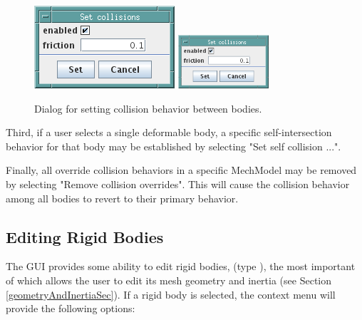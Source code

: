 \documentclass{article}
\begin{document}
\begin{figure}
\begin{center}
\iflatexml
\includegraphics[]{images/setCollisionsDialog}
\else
\includegraphics[width=0.30\textwidth]{images/setCollisionsDialog}
\fi
\end{center}
\caption{Dialog for setting collision behavior between bodies.}%
\label{setCollisionsDialogFig}
\end{figure}

Third, if a user selects a single deformable body, a specific
self-intersection behavior for that body may be established by selecting
{\sf "Set self collision ..."}.

Finally, all override collision behaviors in a specific MechModel may
be removed by selecting {\sf "Remove collision overrides"}. This will
cause the collision behavior among all bodies to revert to their
primary behavior.

\subsection{Editing Rigid Bodies}

The GUI provides some ability to edit rigid bodies,
(type ), 
the most important
of which allows the user to edit its mesh geometry and inertia (see
Section \ref{geometryAndInertiaSec}).  If a rigid body is selected, the context
menu will provide the following options:
\end{document}
